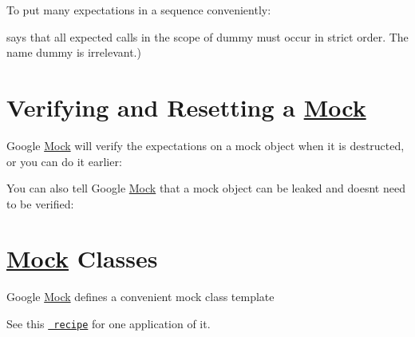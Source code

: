 To put many expectations in a sequence conveniently\+: 
\begin{DoxyCode}{0}
\DoxyCodeLine{\{}
\DoxyCodeLine{}
\DoxyCodeLine{\}}
\end{DoxyCode}
 says that all expected calls in the scope of {\ttfamily dummy} must occur in strict order. The name {\ttfamily dummy} is irrelevant.)

\section*{Verifying and Resetting a \mbox{\hyperlink{classMock}{Mock}}}

Google \mbox{\hyperlink{classMock}{Mock}} will verify the expectations on a mock object when it is destructed, or you can do it earlier\+: 
\begin{DoxyCode}{0}
\end{DoxyCode}


You can also tell Google \mbox{\hyperlink{classMock}{Mock}} that a mock object can be leaked and doesn\textquotesingle{}t need to be verified\+: 
\begin{DoxyCode}{0}
\end{DoxyCode}


\section*{\mbox{\hyperlink{classMock}{Mock}} Classes}

Google \mbox{\hyperlink{classMock}{Mock}} defines a convenient mock class template 
\begin{DoxyCode}{0}
\DoxyCodeLine{\};}
\end{DoxyCode}
 See this \href{CookBook.md\#using-check-points}{\texttt{ recipe}} for one application of it.

